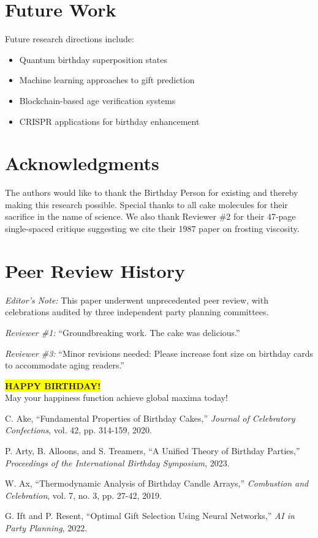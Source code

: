 \documentclass[12pt,a4paper]{article}
\begin{document}
\section{Future Work}

Future research directions include:
\begin{itemize}
    \item Quantum birthday superposition states
    \item Machine learning approaches to gift prediction
    \item Blockchain-based age verification systems
    \item CRISPR applications for birthday enhancement
\end{itemize}

\section{Acknowledgments}

The authors would like to thank the Birthday Person for existing and thereby making this research possible. Special thanks to all cake molecules for their sacrifice in the name of science. We also thank Reviewer \#2 for their 47-page single-spaced critique suggesting we cite their 1987 paper on frosting viscosity.

\section{Peer Review History}

\textit{Editor's Note:} This paper underwent unprecedented peer review, with celebrations audited by three independent party planning committees.

\textit{Reviewer \#1:} ``Groundbreaking work. The cake was delicious.''

\textit{Reviewer \#3:} ``Minor revisions needed: Please increase font size on birthday cards to accommodate aging readers.''

\vspace{1cm}
\begin{center}
\colorbox{yellow}{\Huge \textbf{HAPPY BIRTHDAY!}} \\
\vspace{0.5cm}
{\Large May your happiness function achieve global maxima today!}
\end{center}

\begin{thebibliography}{99}
C. Ake, ``Fundamental Properties of Birthday Cakes,'' \textit{Journal of Celebratory Confections}, vol. 42, pp. 314-159, 2020.

P. Arty, B. Alloons, and S. Treamers, ``A Unified Theory of Birthday Parties,'' \textit{Proceedings of the International Birthday Symposium}, 2023.

W. Ax, ``Thermodynamic Analysis of Birthday Candle Arrays,'' \textit{Combustion and Celebration}, vol. 7, no. 3, pp. 27-42, 2019.

G. Ift and P. Resent, ``Optimal Gift Selection Using Neural Networks,'' \textit{AI in Party Planning}, 2022.
\end{thebibliography}
\end{document}
